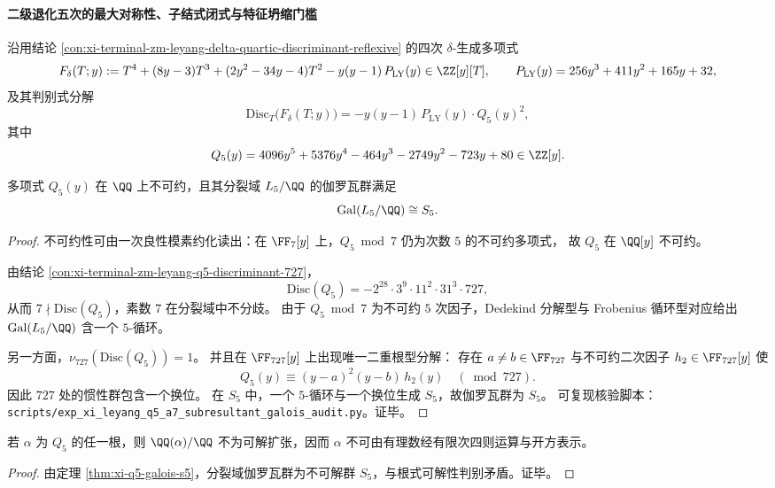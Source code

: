 \paragraph{二级退化五次的最大对称性、子结式闭式与特征坍缩门槛}
沿用结论 \ref{con:xi-terminal-zm-leyang-delta-quartic-discriminant-reflexive} 的四次 \(\delta\)-生成多项式
\[
F_\delta(T;y):=T^{4}+(8y-3)T^{3}+(2y^{2}-34y-4)T^{2}-y(y-1)\,P_{\mathrm{LY}}(y)\in\ZZ[y][T],
\qquad
P_{\mathrm{LY}}(y)=256y^{3}+411y^{2}+165y+32,
\]
及其判别式分解
\[
\mathrm{Disc}_{T}\bigl(F_\delta(T;y)\bigr)=-y(y-1)\,P_{\mathrm{LY}}(y)\cdot Q_{5}(y)^{2},
\]
其中
\[
Q_{5}(y)=4096y^{5}+5376y^{4}-464y^{3}-2749y^{2}-723y+80\in\ZZ[y].
\]

\begin{theorem}[二级退化五次的全对称伽罗瓦群]\label{thm:xi-q5-galois-s5}
多项式 \(Q_5(y)\) 在 \(\QQ\) 上不可约，且其分裂域 \(L_5/\QQ\) 的伽罗瓦群满足
\[
\operatorname{Gal}(L_5/\QQ)\cong S_5.
\]
\end{theorem}
\begin{proof}
不可约性可由一次良性模素约化读出：在 \(\FF_7[y]\) 上，\(Q_5\bmod 7\) 仍为次数 \(5\) 的不可约多项式，
故 \(Q_5\) 在 \(\QQ[y]\) 不可约。

由结论 \ref{con:xi-terminal-zm-leyang-q5-discriminant-727}，
\[
\mathrm{Disc}(Q_5)=-2^{28}\cdot 3^{9}\cdot 11^{2}\cdot 31^{3}\cdot 727,
\]
从而 \(7\nmid \mathrm{Disc}(Q_5)\)，素数 \(7\) 在分裂域中不分歧。
由于 \(Q_5\bmod 7\) 为不可约 \(5\) 次因子，Dedekind 分解型与 Frobenius 循环型对应给出
\(\operatorname{Gal}(L_5/\QQ)\) 含一个 \(5\)-循环。

另一方面，\(\nu_{727}(\mathrm{Disc}(Q_5))=1\)。
并且在 \(\FF_{727}[y]\) 上出现唯一二重根型分解：
存在 \(a\neq b\in\FF_{727}\) 与不可约二次因子 \(h_2\in\FF_{727}[y]\) 使
\[
Q_5(y)\equiv (y-a)^2(y-b)\,h_2(y)\quad(\bmod 727).
\]
因此 \(727\) 处的惯性群包含一个换位。
在 \(S_5\) 中，一个 \(5\)-循环与一个换位生成 \(S_5\)，故伽罗瓦群为 \(S_5\)。
可复现核验脚本：\texttt{scripts/exp\_xi\_leyang\_q5\_a7\_subresultant\_galois\_audit.py}。证毕。
\end{proof}

\begin{corollary}[二级退化参数的不可根式性]\label{cor:xi-q5-unsolvable-by-radicals}
若 \(\alpha\) 为 \(Q_5\) 的任一根，则 \(\QQ(\alpha)/\QQ\) 不为可解扩张，因而 \(\alpha\) 不可由有理数经有限次四则运算与开方表示。
\end{corollary}
\begin{proof}
由定理 \ref{thm:xi-q5-galois-s5}，分裂域伽罗瓦群为不可解群 \(S_5\)，与根式可解性判别矛盾。证毕。
\end{proof}

